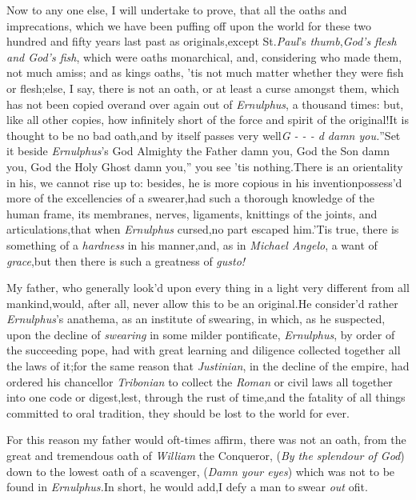 \documentclass{article}
\begin{document}
Now to any one else, I will undertake\break
to prove, that all the oaths and imprecations, 
which we have been puffing off upon 
the world for these two hundred and 
fifty years last past as originals,\tsh except
St.\@ \textit{Paul}’s \textit{thumb},\tsh \textit{God’s flesh\break
and God’s fish}, which were oaths monarchical, and, considering who made
them, not much amiss; and as kings
oaths, ’tis not much matter whether they
were fish or flesh;\tsh else, I say, there is not an oath, or at least a curse
amongst them, which has not been copied over\break and over again out of
\textit{Ernulphus}, a thousand times: but, like all other copies, how
infinitely short of the force and spirit
of the original!\tsk It is thought to be no
bad oath,\tsh and by itself passes very
well\tsh \lqq\textit{G\kern 0.05pt
-\kern 0.05pt
-\kern 0.05pt
-\kern 0.05pt d damn you.}”\tsh Set it\break
beside \textit{Ernulphus}’s\tsh
\lqq God Almighty the Father damn you,\tsk
God the Son damn you,\tsk
God the Holy Ghost damn you,”\tsk
you see ’tis nothing.\tsk There
is an orientality in his, we cannot rise up
to: besides, he is more copious in his
invention\tsk possess’d more of the excellencies of a
swearer,\tsh had such a thorough knowledge of the human
frame, its membranes, nerves, ligaments, knittings of the joints,
and articulations,\tsk that when \textit{Ernulphus} cursed,\tsh no
part escaped him.\tsk ’Tis true, there is something of a
\textit{hardness} in his manner,\tsk and, as in \textit{Michael
Angelo}, a want of \textit{grace},\tsh but then there is such a
greatness of \textit{gusto!}\tsk

My father, who generally look’d upon every thing in a
light very different from all mankind,\tsh would, after all, never
allow this to be an original.\tsh He consider’d rather
\textit{Ernulphus}’s anathema, as an institute of swearing, in
which, as he suspected, upon the decline of \textit{swearing} in some
milder pontificate, \textit{Ernulphus}, by order of the succeeding
pope, had with great learning and diligence collected together all
the laws of it;\tsk for the same reason that \textit{Justinian}, in
the decline of the empire, had ordered his chancellor
\textit{Tribonian} to collect the \textit{Roman} or civil laws all
together into one code or digest,\tsh lest, through the
rust of time,\tsh and the fatality of all things committed
to oral tradition, they should be lost to the world for
ever.

For this reason my father would oft-times affirm, there was not
an oath, from the great and tremendous oath of \textit{William} the
Conqueror, (\textit{By the splendour of God}) down to the lowest oath of a
scavenger, (\textit{Damn your eyes}) which was not to be found in
\textit{Ernulphus.}\tsh In short, he would add,\tsk I defy a man
to swear \textit{out} of\break it.
\end{document}
